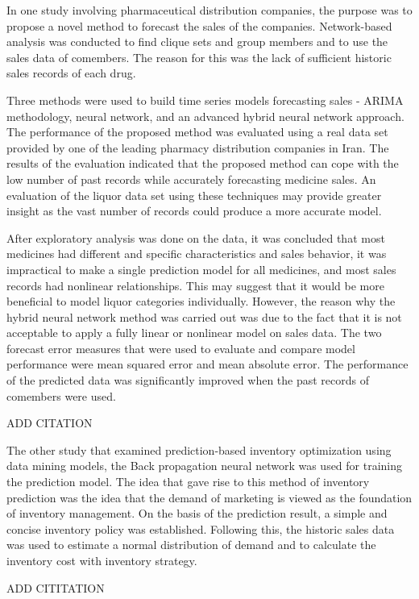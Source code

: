 \documentclass[]{elsarticle} %
\begin{document}
In one study involving pharmaceutical distribution companies, the
purpose was to propose a novel method to forecast the sales of the
companies. Network-based analysis was conducted to find clique sets and
group members and to use the sales data of comembers. The reason for
this was the lack of sufficient historic sales records of each drug.

Three methods were used to build time series models forecasting sales -
ARIMA methodology, neural network, and an advanced hybrid neural network
approach. The performance of the proposed method was evaluated using a
real data set provided by one of the leading pharmacy distribution
companies in Iran. The results of the evaluation indicated that the
proposed method can cope with the low number of past records while
accurately forecasting medicine sales. An evaluation of the liquor data
set using these techniques may provide greater insight as the vast
number of records could produce a more accurate model.

After exploratory analysis was done on the data, it was concluded that
most medicines had different and specific characteristics and sales
behavior, it was impractical to make a single prediction model for all
medicines, and most sales records had nonlinear relationships. This may
suggest that it would be more beneficial to model liquor categories
individually. However, the reason why the hybrid neural network method
was carried out was due to the fact that it is not acceptable to apply a
fully linear or nonlinear model on sales data. The two forecast error
measures that were used to evaluate and compare model performance were
mean squared error and mean absolute error. The performance of the
predicted data was significantly improved when the past records of
comembers were used.

ADD CITATION

The other study that examined prediction-based inventory optimization
using data mining models, the Back propagation neural network was used
for training the prediction model. The idea that gave rise to this
method of inventory prediction was the idea that the demand of marketing
is viewed as the foundation of inventory management. On the basis of the
prediction result, a simple and concise inventory policy was
established. Following this, the historic sales data was used to
estimate a normal distribution of demand and to calculate the inventory
cost with inventory strategy.

ADD CITITATION
\end{document}
